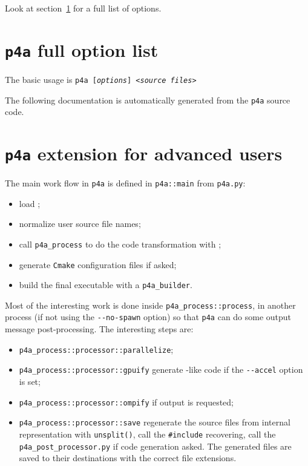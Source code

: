 \documentclass[a4paper]{article}
\begin{document}
Look at section~\ref{sec:options} for a full list of options.

\section{\protect\texttt{p4a} full option list}
\label{sec:options}

The basic usage is \texttt{p4a [\emph{options}] <\emph{source files}>}

The following documentation is automatically generated from the
\texttt{p4a} source code.




\section{\protect\texttt{p4a} extension for advanced users}
\label{sec:p4a-extension}

The main work flow in \texttt{p4a} is
defined in \verb|p4a::main| from \verb|p4a.py|:
\begin{itemize}
\item load \Apyps;
\item normalize user source file names;
\item call \verb|p4a_process| to do the code transformation with \Apyps;
\item generate \texttt{Cmake} configuration files if asked;
\item build the final executable with a \verb|p4a_builder|.
\end{itemize}

Most of the interesting work is done inside \verb|p4a_process::process|,
in another process (if not using the \verb|--no-spawn| option) so that
\texttt{p4a} can do some \Apips output message post-processing. The
interesting steps are:
\begin{itemize}
\item \verb|p4a_process::processor::parallelize|;
\item \verb|p4a_process::processor::gpuify| generate \Agpu-like code if the
  \verb|--accel| option is set;
\item \verb|p4a_process::processor::ompify| if \Aopenmp output
  is requested;
\item \verb|p4a_process::processor::save| regenerate the source files from
  \Apips internal representation with \verb|unsplit()|, call the
  \verb|#include| recovering, call the \verb|p4a_post_processor.py| if
  \Agpu code generation asked. The generated files are saved to
  their destinations with the correct file extensions.
\end{itemize}
\end{document}
